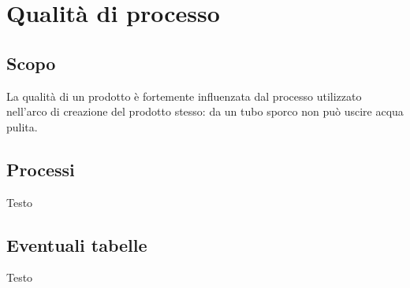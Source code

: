 \section{Qualità di processo}\label{QualitaProcesso}

\subsection{Scopo}
La qualità di un prodotto è fortemente influenzata dal processo utilizzato nell'arco di creazione del prodotto stesso:
da un tubo sporco non può uscire acqua pulita.

\subsection{Processi}
Testo

\subsection{Eventuali tabelle}
Testo